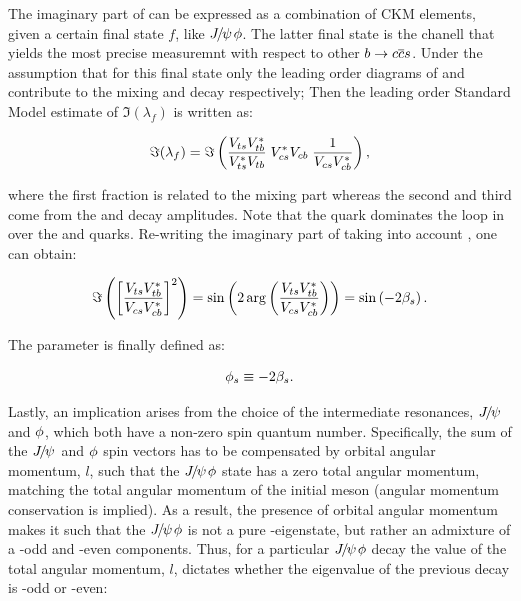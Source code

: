 The imaginary part of  can be expressed as a combination of CKM elements,
given a certain final state $f$, like ${J\mskip -3mu/\mskip -2mu\psi\mskip 2mu}\phi$. The latter final state is the chanell that
yields the most precise \phis measuremnt with respect to other $b \rightarrow c\overline {c}s$.
Under the assumption that for this final state only the leading order diagrams of 
and  contribute to the \BBbarSyst mixing and decay respectively;
Then the leading order Standard Model estimate of $\Im(\lambda_f)$ is written as:

\begin{equation}
  \centering
 \Im(\lambda_f) = \Im\parenthesis{ \frac{\Vts\Vtb^*}{\Vts^*\Vtb} \; \Vcs^*\Vcb \; \frac{1}{\Vcs\Vcb^*} },
 \label{lambdaf_ckm}
\end{equation}

\noindent where the first fraction is related to the mixing part \qoverp whereas the second and third come from
the \Bsb and \Bs decay amplitudes. Note that the \tquark quark dominates the loop in  over the
\cquark and \uquark quarks. Re-writing the imaginary part of  taking into account
, one can obtain:

\begin{equation}
  \centering
  \Im\parenthesis{ \brackets{ \frac{\Vts\Vtb^*}{\Vcs\Vcb^*}}^2 } =
  \sin \parenthesis{2 \arg \parenthesis{\frac{\Vts\Vtb^*}{\Vcs\Vcb^*}}} =
  \sin \parenthesis{-2\betas}.
 \label{lambda_ckm_manip}
\end{equation}

\noindent The parameter \phis is finally defined as:

\begin{equation}
  \centering
  \phis\equiv-2\betas.
 \label{phis_def}
\end{equation}

\noindent Lastly, an implication arises from the choice of the intermediate resonances, ${J\mskip -3mu/\mskip -2mu\psi\mskip 2mu}$ and $\phi$,
which both have a non-zero spin quantum number. Specifically, the sum of the ${J\mskip -3mu/\mskip -2mu\psi\mskip 2mu}$ and $\phi$ spin vectors
has to be compensated by orbital angular momentum, $l$, such that the ${J\mskip -3mu/\mskip -2mu\psi\mskip 2mu}\phi$ state has a zero total
angular momentum, matching the total angular momentum of the initial \Bs meson (angular momentum conservation is implied).
As a result, the presence of orbital angular momentum makes it such that the ${J\mskip -3mu/\mskip -2mu\psi\mskip 2mu}\phi$ is not a pure \CP-eigenstate,
but rather an admixture of a \CP-odd and \CP-even components. Thus, for a particular ${J\mskip -3mu/\mskip -2mu\psi\mskip 2mu}\phi$ decay the value of
the total angular momentum, $l$, dictates whether the \CP eigenvalue of the previous decay is \CP-odd or \CP-even:

